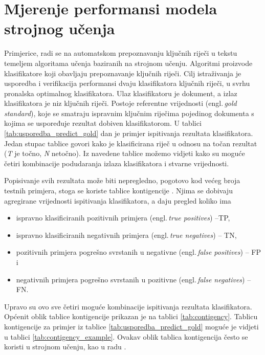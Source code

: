 \section{Mjerenje performansi modela strojnog učenja}

Primjerice, radi se na automatskom prepoznavanju ključnih riječi u tekstu temeljem algoritama učenja baziranih na strojnom učenju. Algoritmi proizvode klasifikatore koji obavljaju prepoznavanje ključnih riječi. Cilj istraživanja je usporedba i verifikacija performansi dvaju klasifikatora ključnih riječi, u svrhu pronalska optimalnog klasifikatora. Ulaz klasifikatoru je dokument, a izlaz klasifikatora je niz ključnih riječi. Postoje referentne vrijednosti (engl.\,\textit{gold standard}), koje se smatraju ispravnim ključnim riječima pojedinog dokumenta s kojima se uspoređuje rezultat dobiven klasifikatorom. U tablici \ref{tab:usporedba_predict_gold} dan je primjer ispitivanja rezultata klasifikatora. Jedan stupac tablice govori kako je klasificirana riječ u odnosu na točan rezultat (\textit{T} je točno, \textit{N} netočno). Iz navedene tablice možemo vidjeti kako su moguće četiri kombinacije podudaranja izlaza klasifikatora i stvarne vrijednosti. 

Popisivanje svih rezultata može biti nepregledno, pogotovo kod većeg broja testnih primjera, stoga se koriste tablice kontigencije . Njima se dobivaju agregirane vrijednosti ispitivanja klasifikatora, a daju pregled koliko ima 
\begin{itemize}
\item ispravno klasificiranih pozitivnih primjera (engl.\,\textit{true positives}) --TP, \item ispravno klasificiranih negativnih primjera (engl.\,\textit{true negatives}) -- TN,
\item pozitivnih primjera pogrešno svrstanih u negativne (engl.\,\textit{false positives}) -- FP i 
\item negativnih primjera pogrešno svrstanih u pozitivne (engl.\,\textit{false negatives}) -- FN.
\end{itemize} Upravo su ovo sve četiri moguće kombinacije ispitivanja rezultata klasifikatora. Općenit oblik tablice kontigencije prikazan je na tablici \ref{tab:contigency}. Tablicu kontigencije za primjer iz tablice \ref{tab:usporedba_predict_gold} moguće je vidjeti u tablici \ref{tab:contigency_example}. Ovakav oblik tablica kontigencija često se koristi u strojnom učenju, kao u radu \cite{hall1999correlation}.

